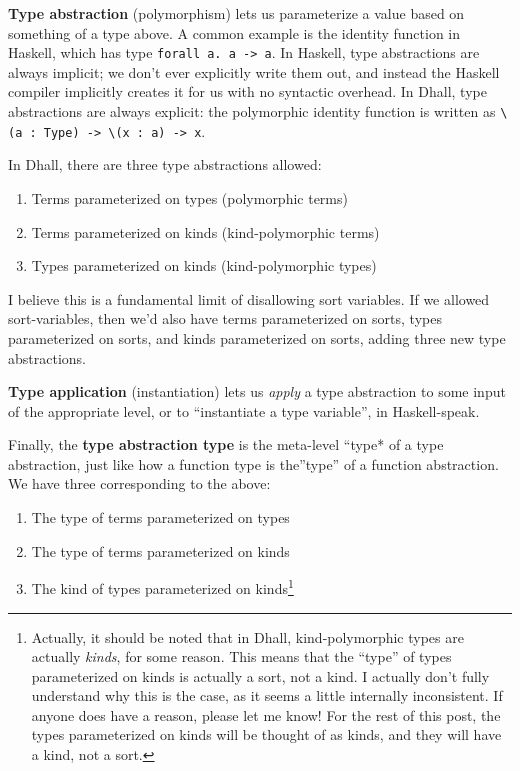 \documentclass[]{article}
\begin{document}
\textbf{Type abstraction} (polymorphism) lets us parameterize a value based on
something of a type above. A common example is the identity function in Haskell,
which has type \texttt{forall\ a.\ a\ -\textgreater{}\ a}. In Haskell, type
abstractions are always implicit; we don't ever explicitly write them out, and
instead the Haskell compiler implicitly creates it for us with no syntactic
overhead. In Dhall, type abstractions are always explicit: the polymorphic
identity function is written as
\texttt{\textbackslash{}(a\ :\ Type)\ -\textgreater{}\ \textbackslash{}(x\ :\ a)\ -\textgreater{}\ x}.

In Dhall, there are three type abstractions allowed:

\begin{enumerate}
\def\labelenumi{\arabic{enumi}.}
\tightlist
\item
  Terms parameterized on types (polymorphic terms)
\item
  Terms parameterized on kinds (kind-polymorphic terms)
\item
  Types parameterized on kinds (kind-polymorphic types)
\end{enumerate}

I believe this is a fundamental limit of disallowing sort variables. If we
allowed sort-variables, then we'd also have terms parameterized on sorts, types
parameterized on sorts, and kinds parameterized on sorts, adding three new type
abstractions.

\textbf{Type application} (instantiation) lets us \emph{apply} a type
abstraction to some input of the appropriate level, or to ``instantiate a type
variable'', in Haskell-speak.

Finally, the \textbf{type abstraction type} is the meta-level ``type* of a type
abstraction, just like how a function type is the''type'' of a function
abstraction. We have three corresponding to the above:

\begin{enumerate}
\def\labelenumi{\arabic{enumi}.}
\tightlist
\item
  The type of terms parameterized on types
\item
  The type of terms parameterized on kinds
\item
  The kind of types parameterized on kinds\footnote{Actually, it should be noted
    that in Dhall, kind-polymorphic types are actually \emph{kinds}, for some
    reason. This means that the ``type'' of types parameterized on kinds is
    actually a sort, not a kind. I actually don't fully understand why this is
    the case, as it seems a little internally inconsistent. If anyone does have
    a reason, please let me know! For the rest of this post, the types
    parameterized on kinds will be thought of as kinds, and they will have a
    kind, not a sort.}
\end{enumerate}
\end{document}
